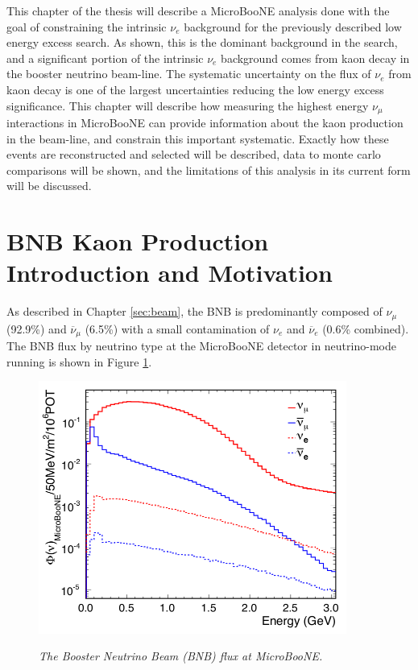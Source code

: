 
This chapter of the thesis will describe a MicroBooNE analysis done with the goal of constraining the intrinsic $\nu_e$ background for the previously described low energy excess search. As shown, this is the dominant background in the search, and a significant portion of the intrinsic $\nu_e$ background comes from kaon decay in the booster neutrino beam-line. The systematic uncertainty on the flux of $\nu_e$ from kaon decay is one of the largest uncertainties reducing the low energy excess significance. This chapter will describe how measuring the highest energy $\nu_\mu$ interactions in MicroBooNE can provide information about the kaon production in the beam-line, and constrain this important systematic. Exactly how these events are reconstructed and selected will be described, data to monte carlo comparisons will be shown, and the limitations of this analysis in its current form will be discussed.

\section{BNB Kaon Production Introduction and Motivation}
As described in Chapter \ref{sec:beam}, the BNB is predominantly composed of $\nu_\mu$ (92.9\%) and $\overline{\nu}_\mu$ (6.5\%) with a small contamination of $\nu_e$ and $\overline{\nu}_e$ (0.6\% combined). The BNB flux by neutrino type at the MicroBooNE detector in neutrino-mode running is shown in Figure \ref{BNB_flux_uboone_fig}.

\begin{figure}[ht!]
\centering
	\includegraphics[width=0.9\textwidth]{Figures/BNB_flux_uboone.png} \\
\caption{\textit{The Booster Neutrino Beam (BNB) flux at MicroBooNE.}}\label{BNB_flux_uboone_fig}
\end{figure}

